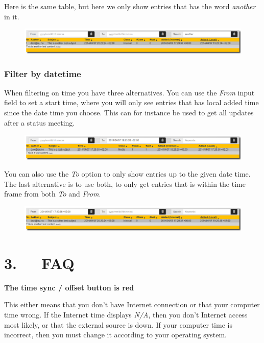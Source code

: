 \documentclass[letterpaper,10pt,english]{sphinxmanual}
\begin{document}
Here is the same table, but here we only show entries that has the word \emph{another} in it.
\begin{figure}[htbp]
\centering

\includegraphics{filter1.png}
\end{figure}


\subsection{Filter by datetime}
\label{User manual:filter-by-datetime}
When filtering on time you have three alternatives. You can use the \emph{From} input field to set a start time, where you will only see entries that has local added time since the date time you choose. This can for instance be used to get all updates after a status meeting.
\begin{figure}[htbp]
\centering

\includegraphics{filter3.png}
\end{figure}

You can also use the \emph{To} option to only show entries up to the given date time.
The last alternative is to use both, to only get entries that is within the time frame from both \emph{To} and \emph{From}.
\begin{figure}[htbp]
\centering

\includegraphics{filter4.png}
\end{figure}


\chapter{3.   FAQ}
\label{FAQ:faq}\label{FAQ::doc}
\textbf{The time sync / offset button is red}

This either means that you don't have Internet connection or that your computer time wrong. If the Internet time displays \emph{N/A}, then you don't Internet access most likely, or that the external source is down. If your computer time is incorrect, then you must change it according to your operating system.
\end{document}
